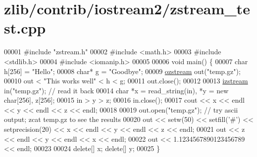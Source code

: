 \hypertarget{zlib_2contrib_2iostream2_2zstream__test_8cpp_source}{}\section{zlib/contrib/iostream2/zstream\+\_\+test.cpp}
\label{zlib_2contrib_2iostream2_2zstream__test_8cpp_source}

\begin{DoxyCode}
00001 \textcolor{preprocessor}{#include "zstream.h"}
00002 \textcolor{preprocessor}{#include <math.h>}
00003 \textcolor{preprocessor}{#include <stdlib.h>}
00004 \textcolor{preprocessor}{#include <iomanip.h>}
00005 
00006 \textcolor{keywordtype}{void} main() \{
00007     \textcolor{keywordtype}{char} h[256] = \textcolor{stringliteral}{"Hello"};
00008     \textcolor{keywordtype}{char}* g = \textcolor{stringliteral}{"Goodbye"};
00009     \hyperlink{classozstream}{ozstream} out(\textcolor{stringliteral}{"temp.gz"});
00010     out < \textcolor{stringliteral}{"This works well"} < h < g;
00011     out.close();
00012 
00013     \hyperlink{classizstream}{izstream} in(\textcolor{stringliteral}{"temp.gz"}); \textcolor{comment}{// read it back}
00014     \textcolor{keywordtype}{char} *x = read\_string(in), *y = \textcolor{keyword}{new} \textcolor{keywordtype}{char}[256], z[256];
00015     in > y > z;
00016     in.close();
00017     cout << x << endl << y << endl << z << endl;
00018 
00019     out.open(\textcolor{stringliteral}{"temp.gz"}); \textcolor{comment}{// try ascii output; zcat temp.gz to see the results}
00020     out << setw(50) << setfill(\textcolor{charliteral}{'#'}) << setprecision(20) << x << endl << y << endl << z << endl;
00021     out << z << endl << y << endl << x << endl;
00022     out << 1.1234567890123456789 << endl;
00023 
00024     \textcolor{keyword}{delete}[] x; \textcolor{keyword}{delete}[] y;
00025 \}
\end{DoxyCode}
